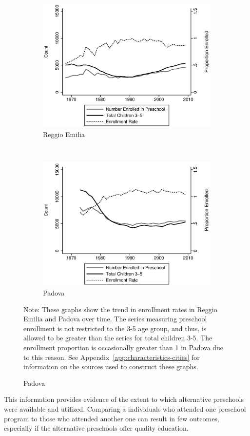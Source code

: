 \begin{figure}[H]
\caption{Preschool Enrollment Rates Over Time}
\label{fig:preschool-enroll}
\begin{center}
\begin{subfigure}[b]{0.55\textwidth}
	\caption{Reggio Emilia}\label{fig:enrollmentRateReggio}
	\includegraphics[width=\textwidth]{../../output/image/enrollment_vs_totalChildren_Reggio.eps}
\end{subfigure}%
~
\begin{subfigure}[b]{0.55\textwidth}
	\caption{Padova}\label{fig:enrollmentRatePadova}
	\includegraphics[width=\textwidth]{../../output/image/enrollment_vs_totalChildren_Padova.eps}
\end{subfigure}%
\end{center}
\raggedright \footnotesize Note: These graphs show the trend in enrollment rates in Reggio Emilia and Padova over time. The series measuring preschool enrollment is not restricted to the 3-5 age group, and thus, is allowed to be greater than the series for total children 3-5. The enrollment proportion is occasionally greater than 1 in Padova due to this reason. See Appendix~\ref{app:characteristics-cities} for information on the sources used to construct these graphs.
\end{figure}

This information provides evidence of the extent to which alternative preschools were available and utilized. Comparing a individuals who attended one preschool program to those who attended another one can result in few outcomes, especially if the alternative preschools offer quality education. 